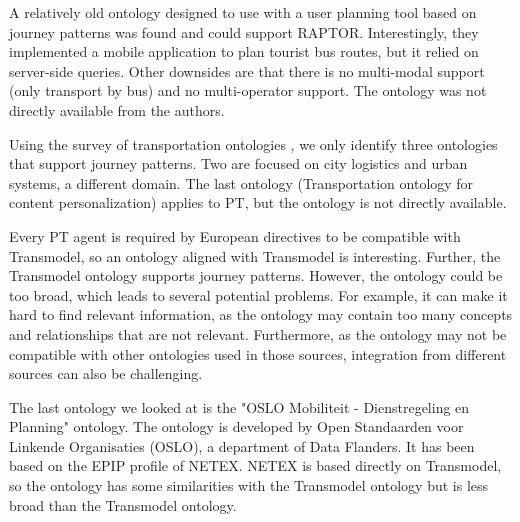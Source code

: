 A relatively old ontology designed to use with a user planning tool based on journey patterns \cite{5507372} was found and could support RAPTOR. Interestingly, they implemented a mobile application to plan tourist bus routes, but it relied on server-side queries. Other downsides are that there is no multi-modal support (only transport by bus) and no multi-operator support. The ontology was not directly available from the authors.

Using the survey of transportation ontologies \cite{Katsumi2018Apr}, we only identify three ontologies that support journey patterns. Two are focused on city logistics and urban systems, a different domain. The last ontology (Transportation ontology for content personalization) applies to PT, but the ontology is not directly available.

Every PT agent is required by European directives to be compatible with Transmodel, so an ontology aligned with Transmodel is interesting. Further, the Transmodel ontology supports journey patterns. However, the ontology could be too broad, which leads to several potential problems. For example, it can make it hard to find relevant information, as the ontology may contain too many concepts and relationships that are not relevant. Furthermore, as the ontology may not be compatible with other ontologies used in those sources, integration from different sources can also be challenging.

The last ontology we looked at is the "OSLO Mobiliteit - Dienstregeling en Planning" \cite{osloflanders} ontology. The ontology is developed by Open Standaarden voor Linkende Organisaties (OSLO), a department of Data Flanders. It has been based on the EPIP profile of NETEX. NETEX is based directly on Transmodel, so the ontology has some similarities with the Transmodel ontology but is less broad than the Transmodel ontology.

